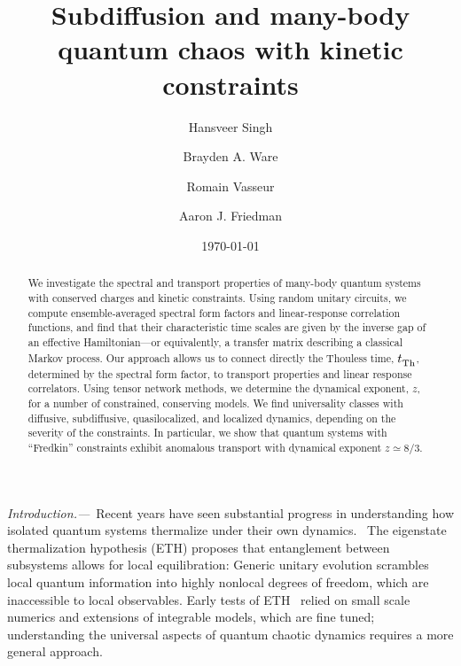 \documentclass[prl,aps,amsfonts,twocolumn,superscriptaddress,notitlepage,floatfix]{revtex4-1}
\begin{document}
\title{Subdiffusion and many-body quantum chaos with kinetic constraints}


\author{Hansveer Singh}
\author{Brayden A. Ware}
\author{Romain Vasseur}
\author{Aaron J. Friedman}
\date{\today}



\begin{abstract}
We investigate the spectral and transport properties of many-body quantum systems with conserved charges and kinetic constraints. Using random unitary circuits, we compute ensemble-averaged spectral form factors and linear-response correlation functions, and find that their characteristic time scales are given by the inverse gap of an effective Hamiltonian---or equivalently, a transfer matrix describing a classical Markov process. Our approach allows us to connect directly the Thouless time, $t^{\vphantom{\dagger}}_{\rm Th}$, determined by the spectral form factor, to transport properties and linear response correlators. 
Using tensor network methods, we determine the dynamical exponent, $z$, for a number of constrained, conserving models. We find universality classes with diffusive, subdiffusive, quasilocalized, and localized dynamics, depending on the severity of the constraints. In particular, we show that quantum systems with ``Fredkin'' constraints exhibit anomalous  transport with dynamical exponent $z \simeq 8/3$. 


\end{abstract}



\maketitle



\noindent \emph{Introduction.---}\,
Recent years have seen substantial progress in understanding how isolated quantum systems thermalize under their own dynamics.~
The eigenstate thermalization hypothesis (ETH) \cite{ETH1,ETH2} proposes that entanglement between subsystems allows for local equilibration: Generic unitary evolution scrambles local quantum information into highly nonlocal degrees of freedom, which are inaccessible to local observables. Early tests of ETH~\cite{PhysRevLett.98.050405,Rigol2008kq,santos2010onset,borgonovi2016quantum,Rigol} relied on 
small scale numerics and extensions of integrable models, which are fine tuned; understanding the universal aspects of quantum chaotic dynamics requires a more general approach.
\end{document}
